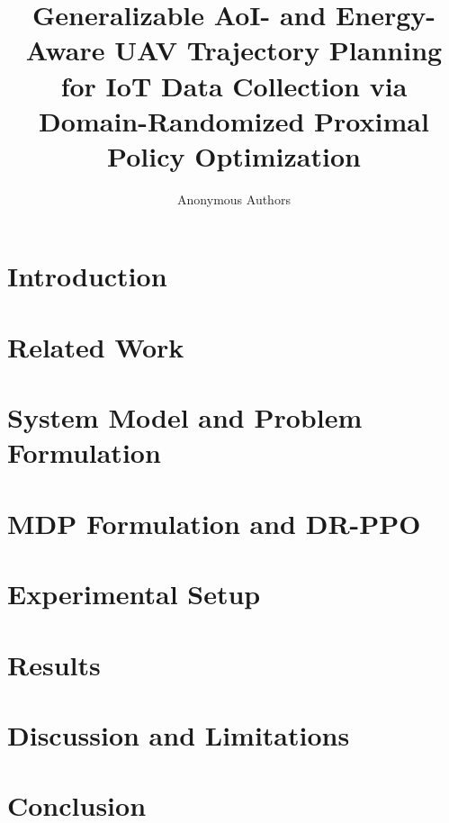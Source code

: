 \documentclass[runningheads]{llncs}
\begin{document}
\title{Generalizable AoI- and Energy-Aware UAV Trajectory Planning for IoT Data Collection via Domain-Randomized Proximal Policy Optimization}
\author{Anonymous Authors}  %
\maketitle

\begin{abstract}
\end{abstract}

\section{Introduction}

\section{Related Work}

\section{System Model and Problem Formulation}

\section{MDP Formulation and DR-PPO}

\section{Experimental Setup}

\section{Results}

\section{Discussion and Limitations}

\section{Conclusion}



\end{document}
